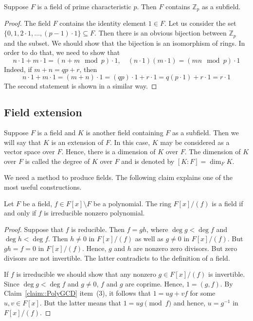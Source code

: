 \begin{claim}
\label{claim::PrimeSubfieldCharP}
Suppose $F$ is a field of prime characteristic $p$.
Then $F$ contains $\mathbb Z_p$ as a subfield.
\end{claim}
\begin{proof}
The field $F$ contains the identity element $1\in F$.
Let us consider the set $\{0, 1, 2\cdot 1, \ldots , (p-1)\cdot 1\}\subseteq F$.
Then there is an obvious bijection between $\mathbb Z_p$ and the subset.
We should show that the bijection is an isomorphism of rings.
In order to do that, we need to show that
\[
n\cdot 1 + m \cdot 1 = (n+m\!\!\mod p)\cdot 1,\quad
(n\cdot 1)(m\cdot 1) = (mn\!\!\mod p)\cdot 1
\]
Indeed, if $m+n = qp + r$, then
\[
n\cdot 1 + m \cdot 1 = (m+n)\cdot 1 = (qp) \cdot 1 + r\cdot 1 = q(p \cdot 1) + r\cdot 1 = r\cdot 1
\]
The second statement is shown in a similar way.
\end{proof}

\subsection{Field extension}

Suppose $F$ is a field and $K$ is another field containing $F$ as a subfield.
Then we will say that $K$ is an extension of $F$.
In this case, $K$ may be considered as a vector space over $F$.
Hence, there is a dimension of $K$ over $F$.
The dimension of $K$ over $F$ is called the degree of $K$ over $F$ and is denoted by $[K:F] = \dim_F K$.


We need a method to produce fields.
The following claim explains one of the most useful constructions.

\begin{claim}
\label{claim::PolyQuotField}
Let $F$ be a field, $f\in F[x]\setminus F$ be a polynomial.
The ring $F[x]/(f)$ is a field if and only if $f$ is irreducible nonzero polynomial.
\end{claim}
\begin{proof}
Suppose that $f$ is reducible.
Then $f = gh$, where $\deg g < \deg f$ and $\deg h < \deg f$.
Then $h\neq 0$ in $F[x]/(f)$ as well as $g\neq 0$ in $F[x]/(f)$.
But $gh = f = 0$ in $F[x]/(f)$.
Hence, $g$ and $h$ are nonzero zero divisors.
But zero divisors are not invertible.
The latter contradicts to the definition of a field.

If $f$ is irreducible we should show that any nonzero $g\in F[x]/(f)$ is invertible.
Since $\deg g < \deg f$ and $g\neq 0$, $f$ and $g$ are coprime.
Hence, $1 = (g, f)$.
By Claim~\ref{claim::PolyGCD} item~(3), it follows that $1 = ug + vf$ for some $u,v\in F[x]$.
But the latter means that $1 = ug\pmod f$ and hence, $u = g^{-1}$ in $F[x]/(f)$.
\end{proof}

